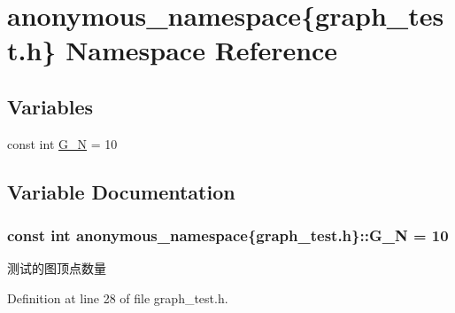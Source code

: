 \hypertarget{namespaceanonymous__namespace_02graph__test_8h_03}{}\section{anonymous\+\_\+namespace\{graph\+\_\+test.\+h\} Namespace Reference}
\label{namespaceanonymous__namespace_02graph__test_8h_03}
\subsection*{Variables}
\begin{DoxyCompactItemize}
\item 
const int \hyperlink{namespaceanonymous__namespace_02graph__test_8h_03_ad767d40dd9cf8d521b2bba3b9bd71061}{G\+\_\+\+N} = 10
\end{DoxyCompactItemize}


\subsection{Variable Documentation}
\hypertarget{namespaceanonymous__namespace_02graph__test_8h_03_ad767d40dd9cf8d521b2bba3b9bd71061}{}
\subsubsection[{G\+\_\+\+N}]{\setlength{\rightskip}{0pt plus 5cm}const int anonymous\+\_\+namespace\{graph\+\_\+test.\+h\}\+::G\+\_\+\+N = 10}\label{namespaceanonymous__namespace_02graph__test_8h_03_ad767d40dd9cf8d521b2bba3b9bd71061}
测试的图顶点数量 

Definition at line 28 of file graph\+\_\+test.\+h.

